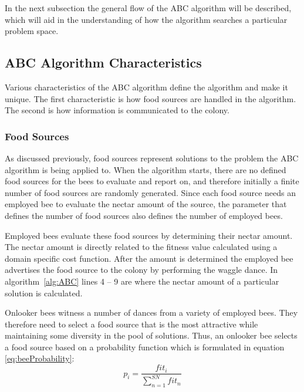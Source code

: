 In the next subsection the general flow of the ABC algorithm will be described, which will aid in the understanding of how the algorithm searches a particular problem space. 
\subsection{ABC Algorithm Characteristics}
Various characteristics of the ABC algorithm define the algorithm and make it unique. The first characteristic is how food sources are handled in the algorithm. The second is how information is communicated to the colony.
\subsubsection{Food Sources}
\label{sec:foodsources}
As discussed previously, food sources represent solutions to the problem the ABC algorithm is being applied to. When the algorithm starts, there are no defined food sources for the bees to evaluate and report on, and therefore initially a finite number of food sources are randomly generated\cite{BeeJobShop,ABCCompareStudy,ABCFusionGrid,ABCNumericalOptimization,ABCImageEnhancement,ABCReconfigDistro}. Since each food source needs an employed bee to evaluate the nectar amount of the source, the parameter that defines the number of food sources also defines the number of employed bees\cite{ABCCompareStudy,ABCLeafConstrained,ABCNumericalOptimization,ABCImageEnhancement}.

Employed bees evaluate these food sources by determining their nectar amount\cite{ABCCompareStudy,ABCLeafConstrained,ABCNumericalOptimization,ABCImageEnhancement}. The nectar amount is directly related to the fitness value calculated using a domain specific cost function\cite{ABCCompareStudy,ABCLeafConstrained,ABCReconfigDistro}. After the amount is determined the employed bee advertises the food source to the colony by performing the waggle dance. In algorithm~\ref{alg:ABC} lines 4 -- 9 are where the nectar amount of a particular solution is calculated.

Onlooker bees witness a number of dances from a variety of employed bees\cite{ABCFusionGrid,BeeJobShop,ABCNumericalOptimization,ABCImageEnhancement,ABCReconfigDistro}. They therefore need to select a food source that is the most attractive while maintaining some diversity in the pool of solutions. Thus, an onlooker bee selects a food source based on a probability function which is formulated in equation \ref{eq:beeProbability}\cite{ABCCompareStudy}:
\begin{equation}
\label{eq:beeProbability}
p_i = \frac{{fit}_i}{\sum^{SN}_{n=1}{fit}_n}
\end{equation}

